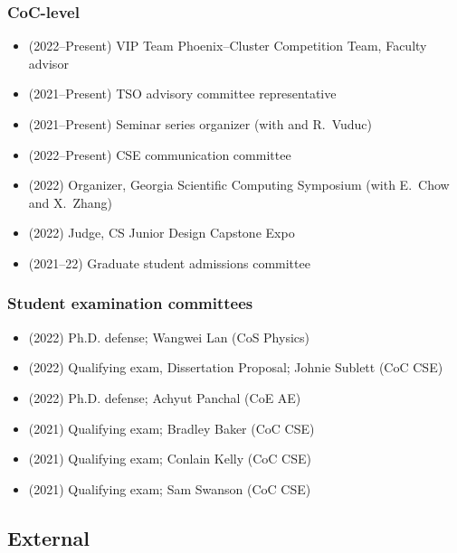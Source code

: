 \subsubsection{CoC-level}

\begin{itemize}
    \item (2022--Present) VIP Team Phoenix--Cluster Competition Team, Faculty advisor
    \item (2021--Present) TSO advisory committee representative
    \item (2021--Present) Seminar series organizer (with \Florian and R.\ Vuduc)
    \item (2022--Present) CSE communication committee
    \item (2022) Organizer, Georgia Scientific Computing Symposium (with E.\ Chow and X.\ Zhang)
    \item (2022) Judge, CS Junior Design Capstone Expo
    \item (2021--22) Graduate student admissions committee
\end{itemize}

\subsubsection{Student examination committees}

\begin{itemize}
    \item (2022) Ph.D. defense; Wangwei Lan (CoS Physics)
    \item (2022) Qualifying exam, Dissertation Proposal; Johnie Sublett (CoC CSE)
    \item (2022) Ph.D. defense; Achyut Panchal (CoE AE)
    \item (2021) Qualifying exam; Bradley Baker (CoC CSE)
    \item (2021) Qualifying exam; Conlain Kelly (CoC CSE)
    \item (2021) Qualifying exam; Sam Swanson (CoC CSE)
\end{itemize}

\subsection{External}

